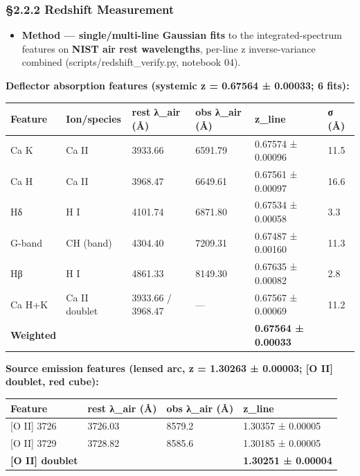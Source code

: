 \documentclass[
]{article}
\providecommand{\tightlist}{%
  \setlength{\itemsep}{0pt}\setlength{\parskip}{0pt}}
\newcommand{\BreakablePath}[1]{{\ttfamily\sloppy #1}}
\begin{document}
\hypertarget{redshift-measurement}{%
\subsubsection{§2.2.2 Redshift Measurement}\label{redshift-measurement}}

\begin{itemize}
\tightlist
\item
  \textbf{Method --- single/multi-line Gaussian fits} to the
  integrated-spectrum features on \textbf{NIST air rest wavelengths},
  per-line z inverse-variance combined
  (\BreakablePath{scripts/\discretionary{}{}{}redshift\_\discretionary{}{}{}verify.\discretionary{}{}{}py},
  notebook 04).
\end{itemize}

\textbf{Deflector absorption features (systemic z = 0.67564 ± 0.00033; 6
fits):}

\begin{longtable}[]{@{}llllll@{}}
\toprule
Feature & Ion/species & rest λ\_air (Å) & obs λ\_air (Å) & z\_line & σ
(Å) \\
\midrule
\endhead
Ca K & Ca II & 3933.66 & 6591.79 & 0.67574 ± 0.00096 & 11.5 \\
Ca H & Ca II & 3968.47 & 6649.61 & 0.67561 ± 0.00097 & 16.6 \\
Hδ & H I & 4101.74 & 6871.80 & 0.67534 ± 0.00058 & 3.3 \\
G-band & CH (band) & 4304.40 & 7209.31 & 0.67487 ± 0.00160 & 11.3 \\
Hβ & H I & 4861.33 & 8149.30 & 0.67635 ± 0.00082 & 2.8 \\
Ca H+K & Ca II doublet & 3933.66 / 3968.47 & --- & 0.67567 ± 0.00069 &
11.2 \\
\textbf{Weighted} & & & & \textbf{0.67564 ± 0.00033} & \\
\bottomrule
\end{longtable}

\textbf{Source emission features (lensed arc, z = 1.30263 ± 0.00003;
{[}O II{]} doublet, red cube):}

\begin{longtable}[]{@{}llll@{}}
\toprule
Feature & rest λ\_air (Å) & obs λ\_air (Å) & z\_line \\
\midrule
\endhead
{[}O II{]} 3726 & 3726.03 & 8579.2 & 1.30357 ± 0.00005 \\
{[}O II{]} 3729 & 3728.82 & 8585.6 & 1.30185 ± 0.00005 \\
\textbf{{[}O II{]} doublet} & & & \textbf{1.30251 ± 0.00004} \\
\bottomrule
\end{longtable}
\end{document}
